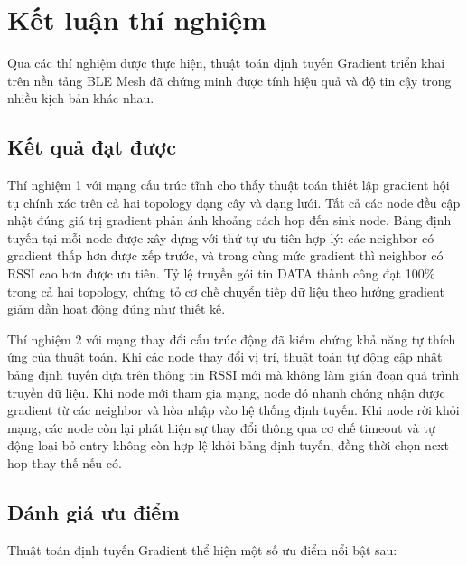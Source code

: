 \section{Kết luận thí nghiệm}
\label{sec:experiment_conclusion}

Qua các thí nghiệm được thực hiện, thuật toán định tuyến Gradient triển khai trên nền tảng BLE Mesh đã chứng minh được tính hiệu quả và độ tin cậy trong nhiều kịch bản khác nhau.

\subsection{Kết quả đạt được}

Thí nghiệm 1 với mạng cấu trúc tĩnh cho thấy thuật toán thiết lập gradient hội tụ chính xác trên cả hai topology dạng cây và dạng lưới. Tất cả các node đều cập nhật đúng giá trị gradient phản ánh khoảng cách hop đến sink node. Bảng định tuyến tại mỗi node được xây dựng với thứ tự ưu tiên hợp lý: các neighbor có gradient thấp hơn được xếp trước, và trong cùng mức gradient thì neighbor có RSSI cao hơn được ưu tiên. Tỷ lệ truyền gói tin DATA thành công đạt 100\% trong cả hai topology, chứng tỏ cơ chế chuyển tiếp dữ liệu theo hướng gradient giảm dần hoạt động đúng như thiết kế.

Thí nghiệm 2 với mạng thay đổi cấu trúc động đã kiểm chứng khả năng tự thích ứng của thuật toán. Khi các node thay đổi vị trí, thuật toán tự động cập nhật bảng định tuyến dựa trên thông tin RSSI mới mà không làm gián đoạn quá trình truyền dữ liệu. Khi node mới tham gia mạng, node đó nhanh chóng nhận được gradient từ các neighbor và hòa nhập vào hệ thống định tuyến. Khi node rời khỏi mạng, các node còn lại phát hiện sự thay đổi thông qua cơ chế timeout và tự động loại bỏ entry không còn hợp lệ khỏi bảng định tuyến, đồng thời chọn next-hop thay thế nếu có.

\subsection{Đánh giá ưu điểm}

Thuật toán định tuyến Gradient thể hiện một số ưu điểm nổi bật sau:

